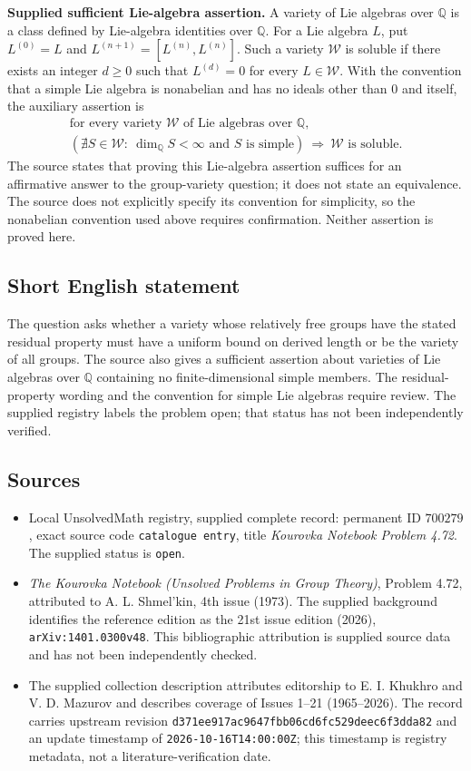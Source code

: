 \documentclass[11pt]{article}
\newcommand{\Q}{\mathbb{Q}}
\begin{document}
\textbf{Supplied sufficient Lie-algebra assertion.} A variety of Lie algebras over \(\Q\) is a class defined by Lie-algebra identities over \(\Q\). For a Lie algebra \(L\), put \(L^{(0)}=L\) and \(L^{(n+1)}=[L^{(n)},L^{(n)}]\). Such a variety \(\mathcal W\) is soluble if there exists an integer \(d\geq 0\) such that \(L^{(d)}=0\) for every \(L\in\mathcal W\). With the convention that a simple Lie algebra is nonabelian and has no ideals other than \(0\) and itself, the auxiliary assertion is
\[
\begin{gathered}
\text{for every variety }\mathcal W\text{ of Lie algebras over }\Q,\\
\left(\nexists S\in\mathcal W:\ \dim_{\Q}S<\infty\text{ and }S\text{ is simple}\right)
\ \Longrightarrow\ \mathcal W\text{ is soluble}.
\end{gathered}
\]
The source states that proving this Lie-algebra assertion suffices for an affirmative answer to the group-variety question; it does not state an equivalence. The source does not explicitly specify its convention for simplicity, so the nonabelian convention used above requires confirmation. Neither assertion is proved here.
\subsection{Short English statement}
The question asks whether a variety whose relatively free groups have the stated residual property must have a uniform bound on derived length or be the variety of all groups. The source also gives a sufficient assertion about varieties of Lie algebras over \(\Q\) containing no finite-dimensional simple members. The residual-property wording and the convention for simple Lie algebras require review. The supplied registry labels the problem open; that status has not been independently verified.
\subsection{Sources}
\begin{itemize}
\item Local UnsolvedMath registry, supplied complete record: permanent ID \(700279\), exact source code \texttt{catalogue entry}, title \emph{Kourovka Notebook Problem 4.72}. The supplied status is \texttt{open}.
\item \emph{The Kourovka Notebook (Unsolved Problems in Group Theory)}, Problem 4.72, attributed to A. L. Shmel'kin, 4th issue (1973). The supplied background identifies the reference edition as the 21st issue edition (2026), \texttt{arXiv:1401.0300v48}. This bibliographic attribution is supplied source data and has not been independently checked.
\item The supplied collection description attributes editorship to E. I. Khukhro and V. D. Mazurov and describes coverage of Issues 1--21 (1965--2026). The record carries upstream revision \texttt{d371ee917ac9647fbb06cd6fc529deec6f3dda82} and an update timestamp of \texttt{2026-10-16T14:00:00Z}; this timestamp is registry metadata, not a literature-verification date.
\end{itemize}
\end{document}
